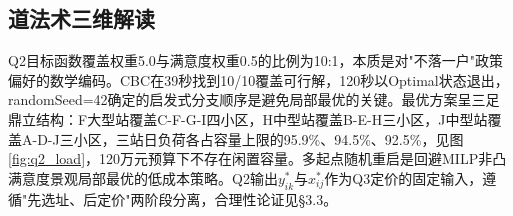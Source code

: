 \subsection{道法术三维解读}

Q2目标函数覆盖权重5.0与满意度权重0.5的比例为10:1，本质是对"不落一户"政策偏好的数学编码。CBC在39秒找到10/10覆盖可行解，120秒以Optimal状态退出，randomSeed=42确定的启发式分支顺序是避免局部最优的关键。最优方案呈三足鼎立结构：F大型站覆盖C-F-G-I四小区，H中型站覆盖B-E-H三小区，J中型站覆盖A-D-J三小区，三站日负荷各占容量上限的95.9\%、94.5\%、92.5\%，见图\ref{fig:q2_load}，120万元预算下不存在闲置容量。多起点随机重启是回避MILP非凸满意度景观局部最优的低成本策略。Q2输出$y_{ik}^*$与$x_{ij}^*$作为Q3定价的固定输入，遵循"先选址、后定价"两阶段分离，合理性论证见§3.3。
